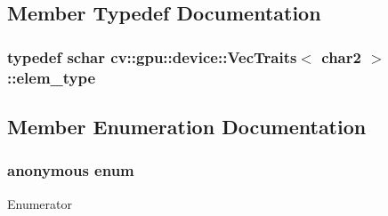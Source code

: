\subsection{Member Typedef Documentation}
\hypertarget{structcv_1_1gpu_1_1device_1_1VecTraits_3_01char2_01_4_ae5f29450f72693318aa5329c10d2b053}{
\subsubsection[{elem\-\_\-type}]{\setlength{\rightskip}{0pt plus 5cm}typedef {\bf schar} {\bf cv\-::gpu\-::device\-::\-Vec\-Traits}$<$ char2 $>$\-::{\bf elem\-\_\-type}}}\label{structcv_1_1gpu_1_1device_1_1VecTraits_3_01char2_01_4_ae5f29450f72693318aa5329c10d2b053}


\subsection{Member Enumeration Documentation}
\hypertarget{structcv_1_1gpu_1_1device_1_1VecTraits_3_01char2_01_4_af7a9402d7973c8116134ac1b0b3ded47}{\subsubsection[{anonymous enum}]{\setlength{\rightskip}{0pt plus 5cm}anonymous enum}}\label{structcv_1_1gpu_1_1device_1_1VecTraits_3_01char2_01_4_af7a9402d7973c8116134ac1b0b3ded47}
\begin{Desc}
\item[Enumerator]\par
\begin{description}
\item[{\em 
\hypertarget{structcv_1_1gpu_1_1device_1_1VecTraits_3_01char2_01_4_af7a9402d7973c8116134ac1b0b3ded47a88b37ac9bf3a53ac20c316d29489a411}{cn}\label{structcv_1_1gpu_1_1device_1_1VecTraits_3_01char2_01_4_af7a9402d7973c8116134ac1b0b3ded47a88b37ac9bf3a53ac20c316d29489a411}
}]\end{description}
\end{Desc}


